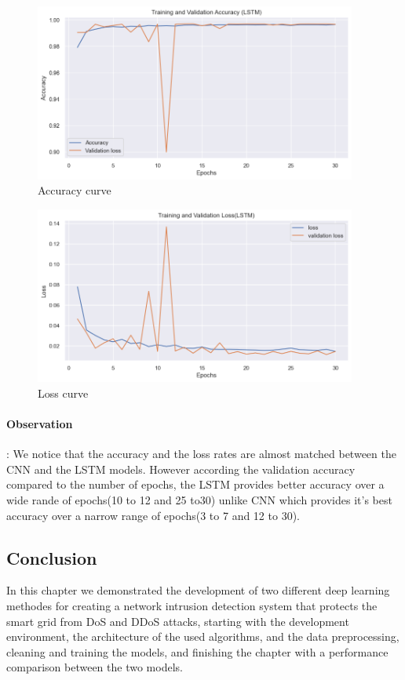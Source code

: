 		\begin{figure}[h]
			\centering
			\includegraphics[width=400px]{figures/LSTM_training_validation.png}
			\caption{Accuracy curve}
			\label{fig:aa}
		\end{figure}
		\begin{figure}[h]
			\centering
			\includegraphics[width=400px]{figures/LSTM_training_validation_loss.png}
			\caption{ Loss curve}
			\label{fig:ff}
		\end{figure}
		





\paragraph{Observation}: We notice that the accuracy and the loss rates are almost matched between the CNN and the LSTM models. However according the validation accuracy compared to the number of epochs, the LSTM provides better accuracy over a wide rande of epochs(10 to 12 and 25 to30) unlike CNN which provides it's best accuracy over a narrow range of epochs(3 to 7 and 12 to 30).

		







\subsection{Conclusion}
In this chapter we demonstrated the development of two different deep learning methodes for creating a network intrusion detection system that protects the smart grid from DoS and DDoS attacks, starting with the development environment, the architecture of the used algorithms, and the data preprocessing, cleaning and training the models, and finishing the chapter with a performance comparison between the two models.





\newpage













